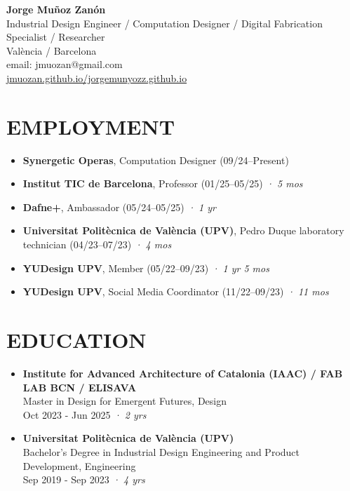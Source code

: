 \documentclass[11pt,a4paper]{article}
\begin{document}
\begin{center}
\textbf{\Large Jorge Muñoz Zanón}\\
\vspace{0.1cm}
Industrial Design Engineer / Computation Designer / Digital Fabrication Specialist / Researcher\\
València / Barcelona\\
email: jmuozan@gmail.com\\
\href{https://jmuozan.github.io/jorgemunyozz.github.io/}{jmuozan.github.io/jorgemunyozz.github.io}
\end{center}

\section*{EMPLOYMENT}
\begin{itemize}[leftmargin=*,label={},itemsep=6pt]
    \item \textbf{Synergetic Operas}, Computation Designer (09/24--Present) %
    \item \textbf{Institut TIC de Barcelona}, Professor (01/25--05/25) \textit{· 5 mos} 
    \item \textbf{Dafne+}, Ambassador (05/24--05/25) \textit{· 1 yr}
    \item \textbf{Universitat Politècnica de València (UPV)}, Pedro Duque laboratory technician (04/23--07/23) \textit{· 4 mos}
    \item \textbf{YUDesign UPV}, Member (05/22--09/23) \textit{· 1 yr 5 mos}
    \item \textbf{YUDesign UPV}, Social Media Coordinator (11/22--09/23) \textit{· 11 mos}
\end{itemize}

\section*{EDUCATION}
\begin{itemize}[leftmargin=*,label={},itemsep=6pt]
    \item \textbf{Institute for Advanced Architecture of Catalonia (IAAC) / FAB LAB BCN / ELISAVA}\\
    Master in Design for Emergent Futures, Design\\
    Oct 2023 - Jun 2025 \textit{· 2 yrs}
    
    \item \textbf{Universitat Politècnica de València (UPV)}\\
    Bachelor's Degree in Industrial Design Engineering and Product Development, Engineering\\
    Sep 2019 - Sep 2023 \textit{· 4 yrs}
\end{itemize}
\end{document}

